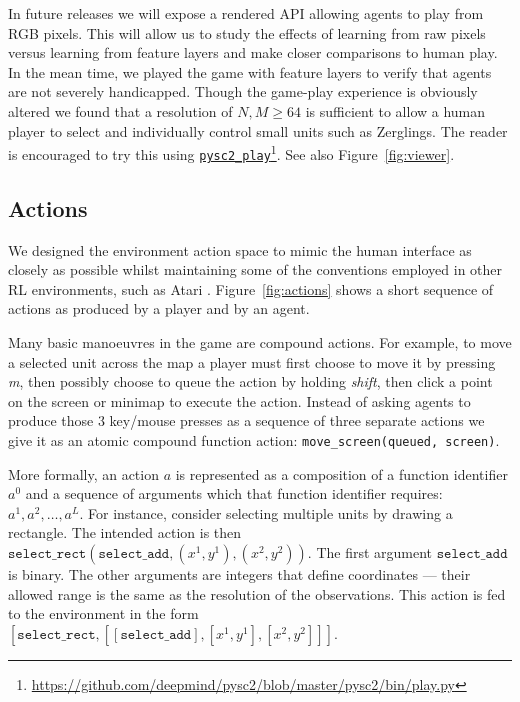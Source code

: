 In future releases we will expose a rendered API allowing agents to play from RGB pixels. This will allow us to study the effects of learning from raw pixels versus learning from feature layers and make closer comparisons to human play. In the mean time, we played the game with feature layers to verify that agents are not severely handicapped. Though the game-play experience is obviously altered we found that a resolution of $N, M \ge 64$ is sufficient to allow a human player to select and individually control small units such as Zerglings. The reader is encouraged to try this using \href{https://github.com/deepmind/pysc2/blob/master/pysc2/bin/play.py}{\tt pysc2\_play}\footnote{\url{https://github.com/deepmind/pysc2/blob/master/pysc2/bin/play.py}}. See also Figure~\ref{fig:viewer}.

\subsection{Actions}

We designed the environment action space to mimic the human interface as closely as possible whilst maintaining some of the conventions employed in other RL environments, such as Atari \cite{bellemare2013arcade}. Figure~\ref{fig:actions} shows a short sequence of actions as produced by a player and by an agent.

Many basic manoeuvres in the game are compound actions. For example, to move a selected unit across the map a player must first choose to move it by pressing \textit{m}, then possibly choose to queue the action by holding \textit{shift}, then click a point on the screen or minimap to execute the action. Instead of asking agents to produce those 3 key/mouse presses as a sequence of three separate actions we give it as an atomic compound function action: {\tt move\_screen(queued, screen)}.

More formally, an action $a$ is represented as a composition of a function identifier $a^0$ and a sequence of arguments which that function identifier requires: $a^1, a^2, \ldots, a^L$. For instance, consider selecting multiple units by drawing a rectangle. The intended action is then $\texttt{select\_rect}(\texttt{select\_add}, (x^1, y^1), (x^2, y^2))$.  The first argument $\texttt{select\_add}$ is binary.  The other arguments are integers that define coordinates --- their allowed range is the same as the resolution of the observations. This action is fed to the environment in the form $[\texttt{select\_rect}, [[\texttt{select\_add}], [x^1, y^1], [x^2, y^2]]]$.

